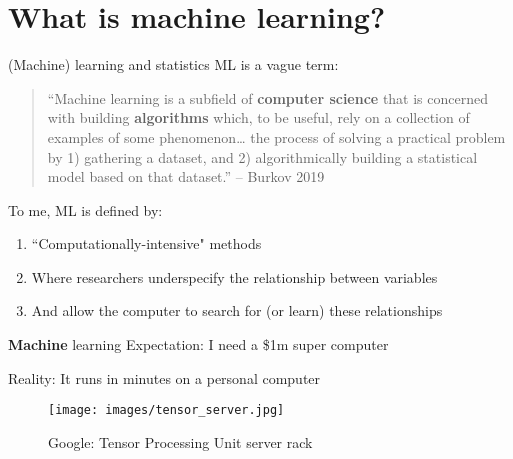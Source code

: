 \documentclass[
  ignorenonframetext,
]{beamer}
\providecommand{\tightlist}{%
  \setlength{\itemsep}{0pt}\setlength{\parskip}{0pt}}
\begin{document}
\hypertarget{what-is-machine-learning}{%
\section{What is machine learning?}\label{what-is-machine-learning}}

\begin{frame}{(Machine) learning and statistics}
\protect\hypertarget{machine-learning-and-statistics}{}
ML is a vague term: \vspace{1em}

\begin{quote}
``Machine learning is a subfield of \textbf{computer science} that is
concerned with building \textbf{algorithms} which, to be useful, rely on
a collection of examples of some phenomenon\ldots{} the process of
solving a practical problem by 1) gathering a dataset, and 2)
algorithmically building a statistical model based on that dataset.'' --
Burkov 2019
\end{quote}

\vspace{1em}

To me, ML is defined by:

\begin{enumerate}
\tightlist
\item
  ``Computationally-intensive" methods
\item
  Where researchers underspecify the relationship between variables
\item
  And allow the computer to search for (or learn) these relationships
\end{enumerate}
\end{frame}

\begin{frame}{\textbf{Machine} learning}
\protect\hypertarget{machine-learning}{}
Expectation: I need a \$1m super computer

Reality: It runs in minutes on a personal computer

\begin{figure}
\centering
\texttt{[image: images/tensor\_server.jpg]}
\caption{Google: Tensor Processing Unit server rack}
\end{figure}
\end{frame}
\end{document}
